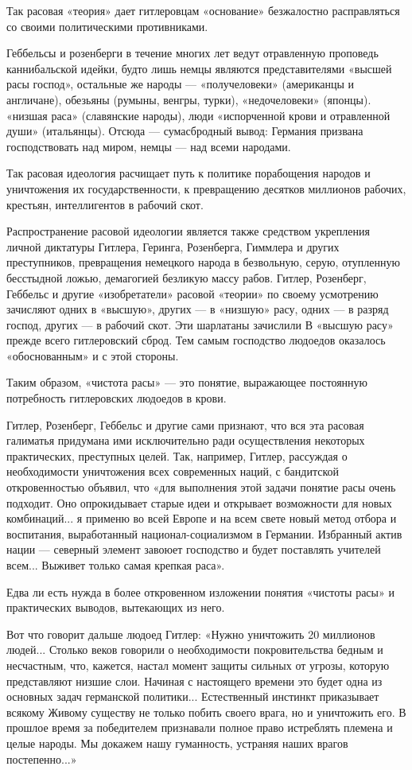 \documentclass[12pt, a4paper, openany]{book}
\begin{document}
Так расовая «теория» дает гитлеровцам «основание» безжалостно расправляться со своими политическими противниками.

Геббельсы и розенберги в течение многих лет ведут отравленную проповедь каннибальской идейки, будто лишь немцы являются представителями «высшей расы господ», остальные же народы — «получеловеки» (американцы и англичане), обезьяны (румыны, венгры, турки), «недочеловеки» (японцы). «низшая раса» (славянские народы), люди «испорченной крови и отравленной души» (итальянцы). Отсюда — сумасбродный вывод: Германия призвана господствовать над миром, немцы — над всеми народами.

Так расовая идеология расчищает путь к политике порабощения народов и уничтожения их государственности, к превращению десятков миллионов рабочих, крестьян, интеллигентов в рабочий скот.

Распространение расовой идеологии является также средством укрепления личной диктатуры Гитлера, Геринга, Розенберга, Гиммлера и других преступников, превращения	немецкого народа в безвольную, серую, отупленную бесстыдной ложью, демагогией безликую массу рабов. Гитлер, Розенберг, Геббельс и другие «изобретатели» расовой «теории» по своему усмотрению зачисляют одних в «высшую», других — в «низшую» расу, одних — в разряд господ, других — в рабочий скот. Эти шарлатаны зачислили В «высшую расу» прежде всего гитлеровский сброд. Тем самым господство людоедов оказалось «обоснованным» и с этой стороны.

Таким образом, «чистота расы» — это понятие, выражающее постоянную потребность гитлеровских людоедов в крови.

Гитлер, Розенберг, Геббельс и другие сами признают, что вся эта расовая галиматья придумана ими исключительно ради осуществления некоторых практических, преступных целей. Так, например, Гитлер, рассуждая о необходимости уничтожения всех современных наций, с бандитской откровенностью объявил, что «для выполнения этой задачи понятие расы очень подходит. Оно опрокидывает старые идеи и открывает возможности для новых комбинаций... я применю во всей Европе и на всем свете новый метод отбора и воспитания, выработанный национал-социализмом в Германии. Избранный актив нации — северный элемент завоюет господство и будет поставлять учителей всем... Выживет только самая крепкая раса».

Едва ли есть нужда в более откровенном изложении понятия «чистоты расы» и практических выводов, вытекающих из него.

Вот что говорит дальше людоед Гитлер: «Нужно уничтожить 20 миллионов людей... Столько веков говорили о необходимости покровительства бедным и несчастным, что, кажется, настал момент защиты сильных от угрозы, которую представляют низшие слои. Начиная с настоящего времени это будет одна из основных задач германской политики... Естественный инстинкт приказывает всякому Живому существу не только побить своего врага, но и уничтожить его. В прошлое время за победителем признавали полное право истреблять племена и целые народы. Мы докажем нашу гуманность, устраняя наших врагов постепенно...»
\end{document}
